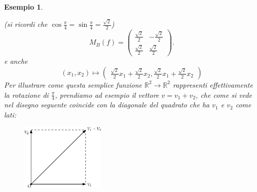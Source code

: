 \documentclass{book}
\newtheorem{esempio}{Esempio}
\begin{document}
\begin{esempio}
\begin{enumerate}
    (si ricordi che $\cos\frac{\pi}{4}=\sin\frac{\pi}{4}=\frac{\sqrt{2}}{2}$)
    \begin{equation*}
      M_B(f)=
      \begin{pmatrix}
        \frac{\sqrt{2}}{2} & -\frac{\sqrt{2}}{2} \\
        \frac{\sqrt{2}}{2} & \frac{\sqrt{2}}{2}
      \end{pmatrix}.
    \end{equation*}
    e anche
    \begin{equation}
      (x_1,x_2)\mapsto
      \begin{pmatrix}
        \frac{\sqrt{2}}{2}x_1+\frac{\sqrt{2}}{2}x_2,\frac{\sqrt{2}}{2}x_1+\frac{\sqrt{2}}{2}x_2
      \end{pmatrix}
    \end{equation}
    Per illustrare come questa semplice funzione $\mathds{R}^2\to\mathds{R}^2$ rappresenti effettivamente la
    rotazione di $\frac{\pi}{4}$, prendiamo ad esempio il vettore $v=v_1+v_2$, che come si vede nel disegno
    seguente coincide con la diagonale del quadrato che ha $v_1$ e $v_2$ come lati:
    \begin{figure}[th]
      \centering
        \includegraphics[width=4cm]{img/finiti/imgex4-3-4.eps}
    \end{figure}


\end{enumerate}
\end{esempio}
\end{document}

